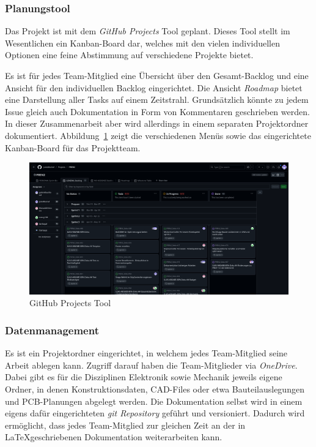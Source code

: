\documentclass[main.tex]{subfiles} %
\begin{document}
\subsubsection*{Planungstool}
Das Projekt ist mit dem \textit{GitHub Projects} Tool geplant. Dieses Tool stellt im Wesentlichen
ein Kanban-Board dar, welches mit den vielen individuellen Optionen eine feine
Abstimmung auf verschiedene Projekte bietet.

Es ist für jedes Team-Mitglied eine Übersicht über den Gesamt-Backlog und eine
Ansicht für den individuellen Backlog eingerichtet. Die Ansicht
\textit{Roadmap} bietet eine Darstellung aller Tasks auf einem Zeitstrahl.
Grundsätzlich könnte zu jedem Issue gleich auch Dokumentation in Form von
Kommentaren geschrieben werden. In dieser Zusammenarbeit aber wird allerdings
in einem separaten Projektordner dokumentiert.
Abbildung~\ref{fig:GitHubProjectsTool} zeigt die verschiedenen Menüs sowie das
eingerichtete Kanban-Board für das Projektteam.

\begin{figure}[H]
    \centering
    \includegraphics[page=1, width=1\textwidth]{./fig_Projektmanagement/Ansicht_GitHubProjects.png}
    \caption{GitHub Projects Tool}\label{fig:GitHubProjectsTool}
\end{figure}

\subsubsection*{Datenmanagement}
Es ist ein Projektordner eingerichtet, in welchem jedes Team-Mitglied seine Arbeit ablegen kann. Zugriff darauf
haben die Team-Mitglieder via \textit{OneDrive}.
Dabei gibt es für die Disziplinen Elektronik sowie Mechanik jeweils eigene Ordner, in denen Konstruktionsdaten,
CAD-Files oder etwa Bauteilauslegungen und PCB-Planungen abgelegt werden. Die Dokumentation
selbst wird in einem eigens dafür eingerichteten \textit{git Repository} geführt und versioniert.
Dadurch wird ermöglicht, dass jedes Team-Mitglied zur gleichen Zeit an der in \LaTeX geschriebenen
Dokumentation weiterarbeiten kann.
\end{document}
